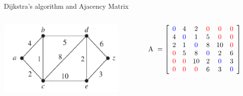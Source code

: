 \documentclass[aspectratio=169]{beamer}
\begin{document}
\begin{frame}[plain]{Dijkstra's algorithm and Ajacency Matrix}
  
 \begin{columns}[t] %
\begin{column}[c]{5cm}

  \begin{center}
      \includegraphics[height=3.7cm]{./img/lecture7-fig1.png}
  \end{center}
   
  \end{column} \pause
  \begin{column}[c]{5cm}
        \[ \mathrm{A}\ = \left[ \begin{array}{cccccc}
                            \textcolor{blue}{0} & 4 & 2 & \textcolor{red}{0} & \textcolor{red}{0} & \textcolor{red}{0} \\
                            4 & \textcolor{blue}{0} & 1 & 5 & \textcolor{red}{0} & \textcolor{red}{0} \\
                            2 & 1 & \textcolor{blue}{0} & 8 & 10 & \textcolor{red}{0} \\
                            \textcolor{red}{0} & 5 & 8 & \textcolor{blue}{0} & 2 & 6 \\
                            \textcolor{red}{0} & \textcolor{red}{0} & 10 & 2 & \textcolor{blue}{0} & 3 \\
                            \textcolor{red}{0} & \textcolor{red}{0} & \textcolor{red}{0} & 6 & 3 & \textcolor{blue}{0}
                           \end{array}
                    \right]                    
   \]   
  \end{column}
  \end{columns}

\end{frame}
\end{document}
